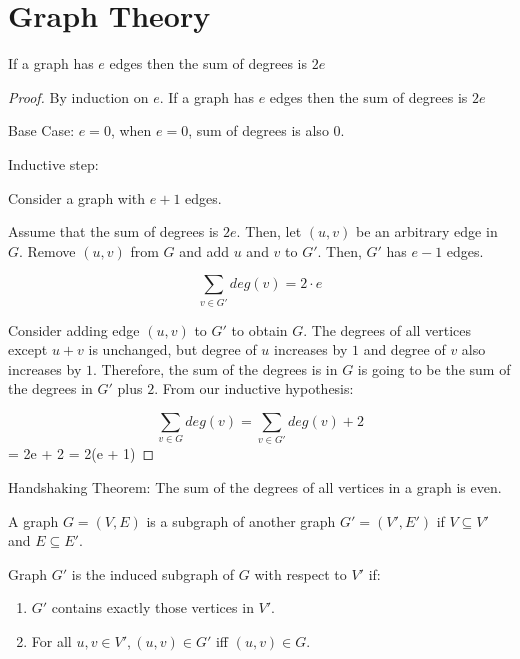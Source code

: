 \documentclass{scrreprt}
\begin{document}
\chapter{Graph Theory}

\begin{theorem}
    If a graph has $e$ edges then the sum of degrees is $2e$
    \begin{proof}
        By induction on $e$. If a graph has $e$ edges then the sum of degrees is $2e$

        Base Case: $e=0$, when $e=0$, sum of degrees is also $0$.

        Inductive step:

        Consider a graph with $e + 1$ edges.

        Assume that the sum of degrees is $2e$. Then, let $(u, v)$ be an arbitrary
        edge in $G$. Remove $(u, v)$ from $G$ and add $u$ and $v$ to $G'$. Then, $G'$
        has $e-1$ edges.

        \[\sum_{v\in G'} deg(v) = 2\cdot e\]

        Consider adding edge $(u, v)$ to $G'$ to obtain $G$. The degrees of all vertices
        except $u + v$ is unchanged, but degree of $u$ increases by $1$ and degree of
        $v$ also increases by $1$. Therefore, the sum of the degrees is in $G$
        is going to be the sum of the degrees in $G'$ plus $2$. From our inductive
        hypothesis:

        \[\sum_{v\in G} deg(v) = \sum_{v\in G'} deg(v) + 2\] = 2e + 2 = 2(e + 1)
    \end{proof}
\end{theorem}

Handshaking Theorem: The sum of the degrees of all vertices in a graph is even.

\begin{definition}
    A graph $G=(V, E)$ is a subgraph of another graph $G' = (V', E')$ if $V \subseteq V'$ and $E \subseteq E'$.
\end{definition}

\begin{definition}
    Graph $G'$ is the induced subgraph of $G$ with respect to $V'$ if:

    \begin{enumerate}
        \item $G'$ contains exactly those vertices in $V'$.
        \item For all $u, v\in V', (u, v) \in G'$ iff $(u, v) \in G$.
    \end{enumerate}
\end{definition}
\end{document}
